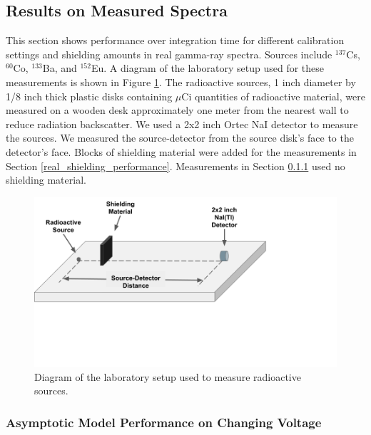 


\subsection{Results on Measured Spectra}

This section shows performance over integration time for different calibration settings and shielding amounts in real gamma-ray spectra. Sources include $^{137}$Cs, $^{60}$Co, $^{133}$Ba, and $^{152}$Eu. A diagram of the laboratory setup used for these measurements is shown in Figure \ref{fig:shielding_measurment_diagram}. The radioactive sources, 1 inch diameter by 1/8 inch thick plastic disks containing $\mu$Ci quantities of radioactive material, were measured on a wooden desk approximately one meter from the nearest wall to reduce radiation backscatter. We used a 2x2 inch Ortec NaI detector to measure the sources. We measured the source-detector from the source disk's face to the detector's face. Blocks of shielding material were added for the measurements in Section \ref{real_shielding_performance}. Measurements in Section \ref{real_calibration_performance} used no shielding material. 

\begin{figure}[H]
	\centering
	\includegraphics[trim=0 200 210 0,clip,width=0.9\linewidth]{images/shielding_measurment_diagram}
	\caption{Diagram of the laboratory setup used to measure radioactive sources.}
	\label{fig:shielding_measurment_diagram}
\end{figure}


\subsubsection{Asymptotic Model Performance on Changing Voltage} \label{real_calibration_performance}

